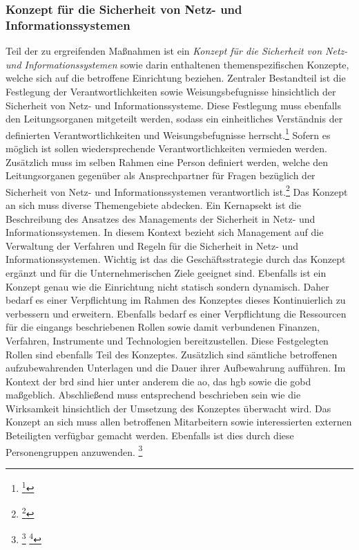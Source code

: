 \documentclass[11pt,a4paper,hidelinks]{article}   %
\begin{document}
            \subsubsection{Konzept für die Sicherheit von Netz- und Informationssystemen}
            Teil der zu ergreifenden Maßnahmen ist ein \emph{Konzept für die Sicherheit von Netz- und Informationssystemen} sowie darin enthaltenen themenspezifischen Konzepte, welche sich auf die betroffene Einrichtung beziehen. Zentraler Bestandteil ist die Festlegung der Verantwortlichkeiten sowie Weisungsbefugnisse hinsichtlich der Sicherheit von Netz- und Informationssysteme. Diese Festlegung muss ebenfalls den Leitungsorganen mitgeteilt werden, sodass ein einheitliches Verständnis der definierten Verantwortlichkeiten und Weisungsbefugnisse herrscht.\footnote{\footcite[Vgl.][, Anhang, Nummer 1.2.1. \& 1.2.4.]{EU2024-2690}} Sofern es möglich ist sollen wiedersprechende Verantwortlichkeiten vermieden werden. Zusätzlich muss im selben Rahmen eine Person definiert werden, welche den Leitungsorganen gegenüber als Ansprechpartner für Fragen bezüglich der Sicherheit von Netz- und Informationssystemen verantwortlich ist.\footnote{\footcite[Vgl.][, Anhang, Nummer 1.2.3.]{EU2024-2690}} Das Konzept an sich muss diverse Themengebiete abdecken. Ein Kernapsekt ist die Beschreibung des Ansatzes des Managements der Sicherheit in Netz- und Informationssystemen. In diesem Kontext bezieht sich Management auf die Verwaltung der Verfahren und Regeln für die Sicherheit in Netz- und Informationssystemen. Wichtig ist das die Geschäftsstrategie durch das Konzept ergänzt und für die Unternehmerischen Ziele geeignet sind. Ebenfalls ist ein Konzept genau wie die Einrichtung nicht statisch sondern dynamisch. Daher bedarf es einer Verpflichtung im Rahmen des Konzeptes dieses Kontinuierlich zu verbessern und erweitern. Ebenfalls bedarf es einer Verpflichtung die Ressourcen für die eingangs beschriebenen Rollen sowie damit verbundenen Finanzen, Verfahren, Instrumente und Technologien bereitzustellen. Diese Festgelegten Rollen sind ebenfalls Teil des Konzeptes. Zusätzlich sind sämtliche betroffenen aufzubewahrenden Unterlagen und die Dauer ihrer Aufbewahrung aufführen. Im Kontext der \gls{brd} sind hier unter anderem die \gls{ao}, das \gls{hgb} sowie die \gls{gobd} maßgeblich. Abschließend muss entsprechend beschrieben sein wie die Wirksamkeit hinsichtlich der Umsetzung des Konzeptes überwacht wird. Das Konzept an sich muss allen betroffenen Mitarbeitern sowie interessierten externen Beteiligten verfügbar gemacht werden. Ebenfalls ist dies durch diese Personengruppen anzuwenden. \footnote{
                \footcite[Vgl.][, Anhang, Nummer 1.2.1.]{EU2024-2690}
                \footcite[Vgl.][, S. 362 \& 375 - 381]{10.1146-annurev.psych.50.1.361}
            }
\end{document}
